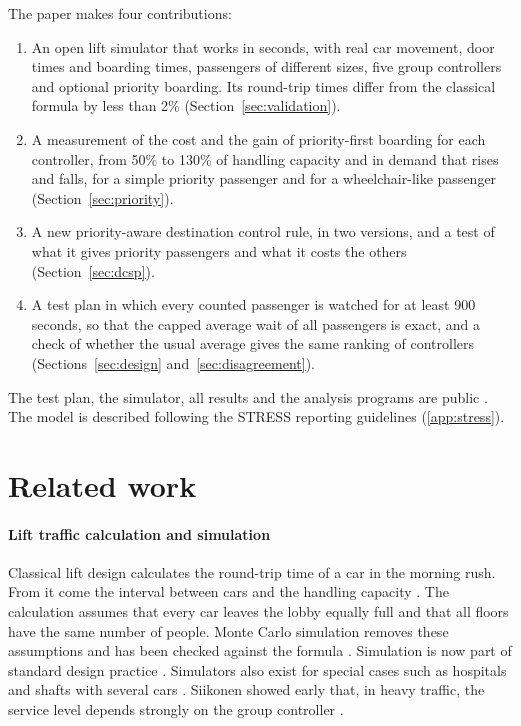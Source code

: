 The paper makes four contributions:
\begin{enumerate}[itemsep=2pt]
\item An open lift simulator that works in seconds, with real car movement, door times and boarding times, passengers of different sizes, five group controllers and optional priority boarding. Its round-trip times differ from the classical formula by less than 2\% (Section~\ref{sec:validation}).
\item A measurement of the cost and the gain of priority-first boarding for each controller, from 50\% to 130\% of handling capacity and in demand that rises and falls, for a simple priority passenger and for a wheelchair-like passenger (Section~\ref{sec:priority}).
\item A new priority-aware destination control rule, in two versions, and a test of what it gives priority passengers and what it costs the others (Section~\ref{sec:dcsp}).
\item A test plan in which every counted passenger is watched for at least 900 seconds, so that the capped average wait of all passengers is exact, and a check of whether the usual average gives the same ranking of controllers (Sections~\ref{sec:design} and~\ref{sec:disagreement}).
\end{enumerate}
The test plan, the simulator, all results and the analysis programs are public \cite{dataset}. The model is described following the STRESS reporting guidelines \cite{monks2019} (\ref{app:stress}).

\section{Related work}\label{sec:related}

\paragraph{Lift traffic calculation and simulation} Classical lift design calculates the round-trip time of a car in the morning rush. From it come the interval between cars and the handling capacity \cite{barney2016}. The calculation assumes that every car leaves the lobby equally full and that all floors have the same number of people. Monte Carlo simulation removes these assumptions and has been checked against the formula \cite{alsharif2012}. Simulation is now part of standard design practice \cite{cibse2025,iso8100}. Simulators also exist for special cases such as hospitals \cite{chu2003} and shafts with several cars \cite{miyamoto2008}. Siikonen showed early that, in heavy traffic, the service level depends strongly on the group controller \cite{siikonen1993}.

